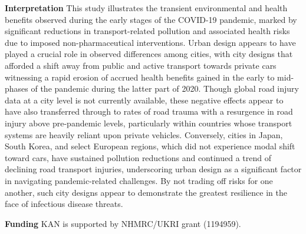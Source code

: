 \documentclass[preprint,10pt]{elsarticle} %
\newcommand{\absdiv}[1]{%
  \par\addvspace{.5\baselineskip}%
  \noindent\textbf{#1}\quad\ignorespaces}
\begin{document}
 \absdiv{\textcolor{OliveGreen}{Interpretation}}
This study illustrates the transient environmental and health benefits observed during the early stages of the COVID-19 pandemic, marked by significant reductions in transport-related pollution and associated health risks due to imposed non-pharmaceutical interventions. Urban design appears to have played a crucial role in observed differences among cities, with city designs that afforded a shift away from public and active transport towards private cars witnessing a rapid erosion of accrued health benefits gained in the early to mid-phases of the pandemic during the latter part of 2020. Though global road injury data at a city level is not currently available, these negative effects appear to have also transferred through to rates of road trauma with a resurgence in road injury above pre-pandemic levels, particularly within countries whose transport systems are heavily reliant upon private vehicles. Conversely, cities in Japan, South Korea, and select European regions, which did not experience modal shift toward cars, have sustained pollution reductions and continued a trend of declining road transport injuries, underscoring urban design as a significant factor in navigating pandemic-related challenges. By not trading off risks for one another, such city designs appear to demonstrate the greatest resilience in the face of infectious disease threats. 
 \absdiv{\textcolor{OliveGreen}{Funding}}
 KAN is supported by NHMRC/UKRI grant (1194959).
\end{document}
